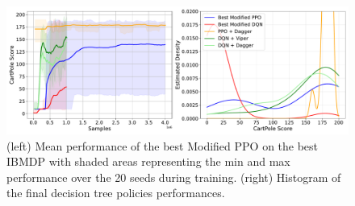 \begin{figure}
    \centering
    \includegraphics[width=1\textwidth]{images/images_part1/ppo_tree_study.pdf}
    \caption{(left) Mean performance of the best Modified PPO on the best IBMDP with shaded areas representing the min and max performance over the 20 seeds during training. (right) Histogram of the final decision tree policies performances.}
\end{figure}


